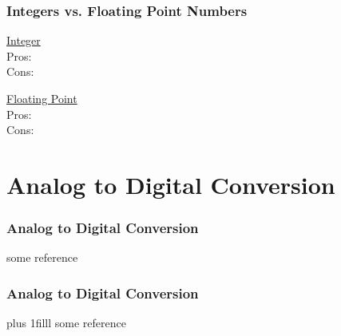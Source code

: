 \documentclass[fleqn]{beamer} %
\newcommand{\sectiontitleIII}{Integers vs. Floating Point Numbers}
\newcommand{\sectiontitleIV}{Analog to Digital Conversion}
\newcommand{\btVFill}{\vskip0pt plus 1filll}
\begin{document}
\begin{frame}[label=sectionIII] \small
\frametitle{\sectiontitleIII}
\begin{multicols}{2}
\underline{Integer} \vspace{20mm}\\
Pros:\vspace{10mm}\\
Cons:

\underline{Floating Point} \vspace{20mm}\\	
Pros:\vspace{10mm}\\
Cons:
\end{multicols}
\end{frame}


\section{\sectiontitleIV}	

\begin{frame}[label=sectionIV] \small
\frametitle{\sectiontitleIV}
\bigskip

\vspace{50mm}
\tiny{some reference}	
\end{frame}

\begin{frame}[label=sectionIV] \small
\frametitle{\sectiontitleIV}
\bigskip



\btVFill
\tiny{some reference}	
\end{frame}
\end{document}
